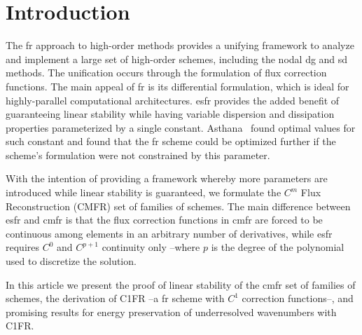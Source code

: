 \section{Introduction}
The \gls{fr} approach to high-order methods provides a unifying framework to analyze and implement a large set of high-order schemes, including the nodal \gls{dg} and \gls{sd} methods. The unification occurs through the formulation of flux correction functions. The main appeal of \gls{fr} is its differential formulation, which is ideal for highly-parallel computational architectures. \gls{esfr} provides the added benefit of guaranteeing linear stability while having variable dispersion and dissipation properties parameterized by a single constant. Asthana~\cite{asthana2014high} found optimal values for such constant and found that the \gls{fr} scheme could be optimized further if the scheme's formulation were not constrained by this parameter.

With the intention of providing a framework whereby more parameters are introduced while linear stability is guaranteed, we formulate the $C^m$ Flux Reconstruction (CMFR) set of families of schemes. The main difference between \gls{esfr} and \gls{cmfr} is that the flux correction functions in \gls{cmfr} are forced to be continuous among elements in an arbitrary number of derivatives, while \gls{esfr} requires $C^0$ and $C^{p+1}$ continuity only --where $p$ is the degree of the polynomial used to discretize the solution.

In this article we present the proof of linear stability of the \gls{cmfr} set of families of schemes, the derivation of C1FR --a \gls{fr} scheme with $C^1$ correction functions--, and promising results for energy preservation of underresolved wavenumbers with C1FR.